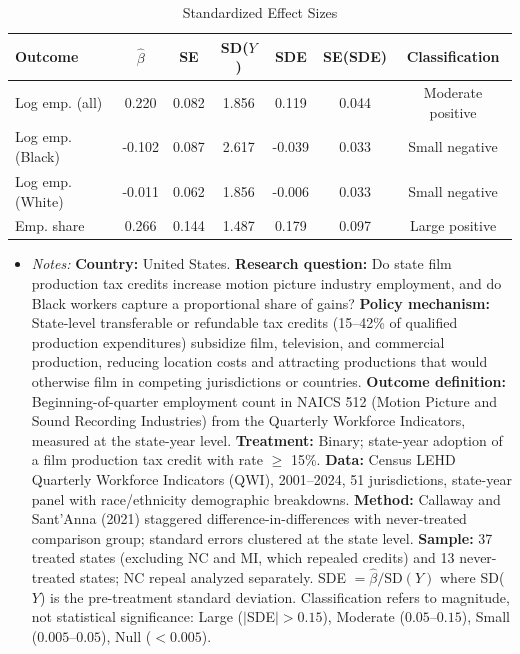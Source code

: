 \begin{table}[htbp]
\centering
\caption{Standardized Effect Sizes}
\label{tab:sde}
\begin{tabular}{lcccccc}
\hline\hline
Outcome & $\hat{\beta}$ & SE & SD($Y$) & SDE & SE(SDE) & Classification \\
\hline
Log emp. (all) & 0.220 & 0.082 & 1.856 & 0.119 & 0.044 & Moderate positive \\
Log emp. (Black) & -0.102 & 0.087 & 2.617 & -0.039 & 0.033 & Small negative \\
Log emp. (White) & -0.011 & 0.062 & 1.856 & -0.006 & 0.033 & Small negative \\
Emp. share & 0.266 & 0.144 & 1.487 & 0.179 & 0.097 & Large positive \\
\hline\hline
\end{tabular}
\par\vspace{0.3em}
{\footnotesize
\begin{itemize}[leftmargin=*,nosep]
\item \textit{Notes:} \textbf{Country:} United States. \textbf{Research question:} Do state film production tax credits increase motion picture industry employment, and do Black workers capture a proportional share of gains? \textbf{Policy mechanism:} State-level transferable or refundable tax credits (15--42\% of qualified production expenditures) subsidize film, television, and commercial production, reducing location costs and attracting productions that would otherwise film in competing jurisdictions or countries. \textbf{Outcome definition:} Beginning-of-quarter employment count in NAICS 512 (Motion Picture and Sound Recording Industries) from the Quarterly Workforce Indicators, measured at the state-year level. \textbf{Treatment:} Binary; state-year adoption of a film production tax credit with rate $\geq$ 15\%. \textbf{Data:} Census LEHD Quarterly Workforce Indicators (QWI), 2001--2024, 51 jurisdictions, state-year panel with race/ethnicity demographic breakdowns. \textbf{Method:} Callaway and Sant'Anna (2021) staggered difference-in-differences with never-treated comparison group; standard errors clustered at the state level. \textbf{Sample:} 37 treated states (excluding NC and MI, which repealed credits) and 13 never-treated states; NC repeal analyzed separately. SDE $= \hat{\beta} / \text{SD}(Y)$ where SD($Y$) is the pre-treatment standard deviation. Classification refers to magnitude, not statistical significance: Large ($|$SDE$| > 0.15$), Moderate ($0.05$--$0.15$), Small ($0.005$--$0.05$), Null ($< 0.005$).
\end{itemize}
}
\end{table}

